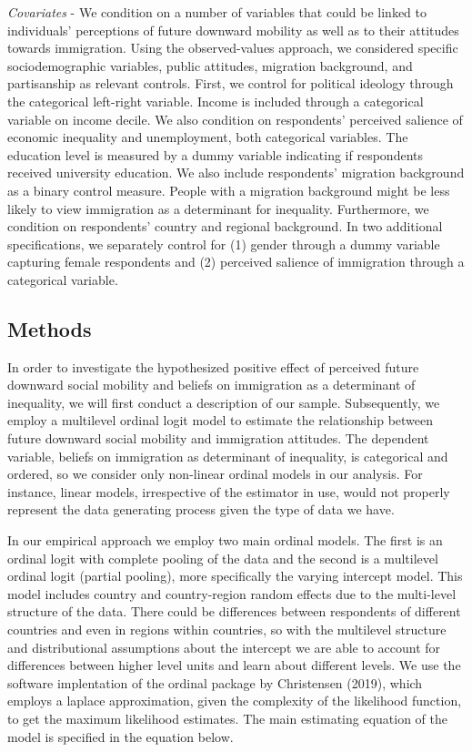 \documentclass[
  11pt,
]{article}
\begin{document}
\noindent\textit {Covariates} - We condition on a number of variables
that could be linked to individuals' perceptions of future downward
mobility as well as to their attitudes towards immigration. Using the
observed-values approach, we considered specific sociodemographic
variables, public attitudes, migration background, and partisanship as
relevant controls. First, we control for political ideology through the
categorical left-right variable. Income is included through a
categorical variable on income decile. We also condition on respondents'
perceived salience of economic inequality and unemployment, both
categorical variables. The education level is measured by a dummy
variable indicating if respondents received university education. We
also include respondents' migration background as a binary control
measure. People with a migration background might be less likely to view
immigration as a determinant for inequality. Furthermore, we condition
on respondents' country and regional background. In two additional
specifications, we separately control for (1) gender through a dummy
variable capturing female respondents and (2) perceived salience of
immigration through a categorical variable.

\hypertarget{methods}{%
\subsection{\texorpdfstring{\textbf{Methods}}{Methods}}\label{methods}}

In order to investigate the hypothesized positive effect of perceived
future downward social mobility and beliefs on immigration as a
determinant of inequality, we will first conduct a description of our
sample. Subsequently, we employ a multilevel ordinal logit model to
estimate the relationship between future downward social mobility and
immigration attitudes. The dependent variable, beliefs on immigration as
determinant of inequality, is categorical and ordered, so we consider
only non-linear ordinal models in our analysis. For instance, linear
models, irrespective of the estimator in use, would not properly
represent the data generating process given the type of data we have.

In our empirical approach we employ two main ordinal models. The first
is an ordinal logit with complete pooling of the data and the second is
a multilevel ordinal logit (partial pooling), more specifically the
varying intercept model. This model includes country and country-region
random effects due to the multi-level structure of the data. There could
be differences between respondents of different countries and even in
regions within countries, so with the multilevel structure and
distributional assumptions about the intercept we are able to account
for differences between higher level units and learn about different
levels. We use the software implentation of the ordinal package by
Christensen (2019), which employs a laplace approximation, given the
complexity of the likelihood function, to get the maximum likelihood
estimates. The main estimating equation of the model is specified in the
equation below.
\end{document}
